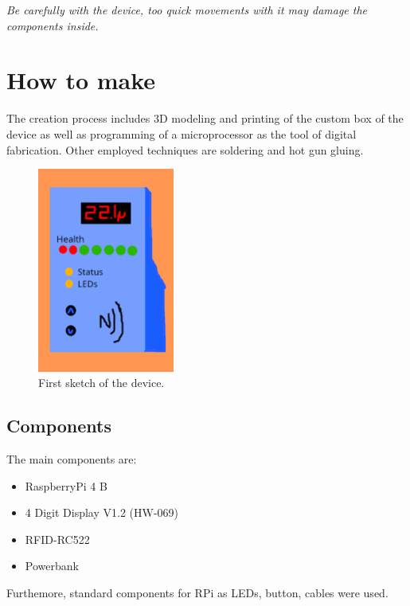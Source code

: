 \documentclass{article}
\begin{document}
\emph{Be carefully with the device, too quick movements with it may damage the components inside.}

\section{How to make}
    The creation process includes 3D modeling and printing of the custom box of the device as well as programming of a microprocessor as the tool of digital fabrication.
    Other employed techniques are soldering and hot gun gluing.

\begin{figure}
    \centering
    \includegraphics[width=0.4\textwidth]{imgs/Sketch.png}
    \caption{First sketch of the device.}
\end{figure}

\subsection{Components}
The main components are:
\begin{itemize}
    \item RaspberryPi 4 B
    \item 4 Digit Display V1.2 (HW-069) 
    \item RFID-RC522
    \item Powerbank
\end{itemize}
Furthemore, standard components for RPi as LEDs, button, cables were used.
\end{document}
